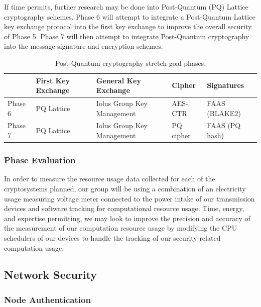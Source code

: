 \documentclass[tikz,a4paper,titlepage]{article}
\begin{document}
If time permits, further research may be done into Post-Quantum (PQ) Lattice cryptography schemes. Phase 6 will attempt to integrate a Post-Quantum Lattice key exchange protocol into the first key exchange to improve the overall security of Phase 5. Phase 7 will then attempt to integrate Post-Quantum cryptography into the message signature and encryption schemes.

\begin{table}[h]
\centering
\begin{tabular}{|l|l|l|l|l|}
\hline
        & First Key Exchange & General Key Exchange & Cipher & Signatures \\ \hline
Phase 6 & PQ Lattice & Iolus Group Key Management & AES-CTR & FAAS (BLAKE2) \\ \hline
Phase 7 & PQ Lattice & Iolus Group Key Management & PQ cipher & FAAS (PQ hash) \\ \hline
\end{tabular}

\caption{Post-Quantum cryptography stretch goal phases.}
\label{PQ-stretchGoals}
\end{table}

\subsubsection{Phase Evaluation}

In order to measure the resource usage data collected for each of the cryptosystems planned, our group will be using a combination of an electricity usage measuring voltage meter connected to the power intake of our transmission devices and software tracking for computational resource usage. Time, energy, and expertise permitting, we may look to improve the precision and accuracy of the measurement of our computation resource usage by modifying the CPU schedulers of our devices to handle the tracking of our security-related computation usage.

\subsection{Network Security}


\subsubsection{Node Authentication}
\label{node_auth}
\end{document}
